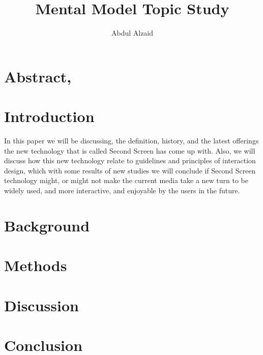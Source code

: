 \documentclass[12pt, oneside]{article}   	%
\title{Mental Model Topic Study}
\author{Abdul Alzaid}
\begin{document}
 \maketitle
  \section{Abstract,}
 \section{Introduction}
In this paper we will be discussing, the definition, history, and the latest offerings the new technology that is called Second Screen has come up with. Also, we will discuss how this new technology relate to guidelines and principles of interaction design, which with some results of new studies we will conclude if Second Screen technology might, or might not make the current media take a new turn to be widely used, and more interactive, and enjoyable by the users in the future. 
 \section{Background}
 \section{Methods}
 \section{Discussion}
 \section{Conclusion}


 
 

 
 
\end{document}
